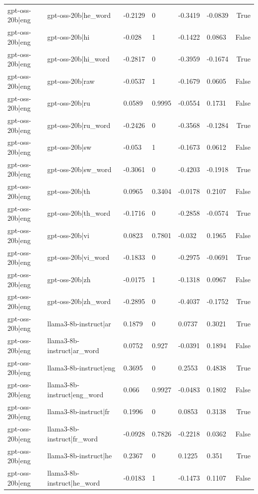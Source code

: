 \begin{table}
\begin{tabular}{llllllr}
gpt-oss-20b|eng & gpt-oss-20b|he_word & -0.2129 & 0 & -0.3419 & -0.0839 & True \\
gpt-oss-20b|eng & gpt-oss-20b|hi & -0.028 & 1 & -0.1422 & 0.0863 & False \\
gpt-oss-20b|eng & gpt-oss-20b|hi_word & -0.2817 & 0 & -0.3959 & -0.1674 & True \\
gpt-oss-20b|eng & gpt-oss-20b|raw & -0.0537 & 1 & -0.1679 & 0.0605 & False \\
gpt-oss-20b|eng & gpt-oss-20b|ru & 0.0589 & 0.9995 & -0.0554 & 0.1731 & False \\
gpt-oss-20b|eng & gpt-oss-20b|ru_word & -0.2426 & 0 & -0.3568 & -0.1284 & True \\
gpt-oss-20b|eng & gpt-oss-20b|sw & -0.053 & 1 & -0.1673 & 0.0612 & False \\
gpt-oss-20b|eng & gpt-oss-20b|sw_word & -0.3061 & 0 & -0.4203 & -0.1918 & True \\
gpt-oss-20b|eng & gpt-oss-20b|th & 0.0965 & 0.3404 & -0.0178 & 0.2107 & False \\
gpt-oss-20b|eng & gpt-oss-20b|th_word & -0.1716 & 0 & -0.2858 & -0.0574 & True \\
gpt-oss-20b|eng & gpt-oss-20b|vi & 0.0823 & 0.7801 & -0.032 & 0.1965 & False \\
gpt-oss-20b|eng & gpt-oss-20b|vi_word & -0.1833 & 0 & -0.2975 & -0.0691 & True \\
gpt-oss-20b|eng & gpt-oss-20b|zh & -0.0175 & 1 & -0.1318 & 0.0967 & False \\
gpt-oss-20b|eng & gpt-oss-20b|zh_word & -0.2895 & 0 & -0.4037 & -0.1752 & True \\
gpt-oss-20b|eng & llama3-8b-instruct|ar & 0.1879 & 0 & 0.0737 & 0.3021 & True \\
gpt-oss-20b|eng & llama3-8b-instruct|ar_word & 0.0752 & 0.927 & -0.0391 & 0.1894 & False \\
gpt-oss-20b|eng & llama3-8b-instruct|eng & 0.3695 & 0 & 0.2553 & 0.4838 & True \\
gpt-oss-20b|eng & llama3-8b-instruct|eng_word & 0.066 & 0.9927 & -0.0483 & 0.1802 & False \\
gpt-oss-20b|eng & llama3-8b-instruct|fr & 0.1996 & 0 & 0.0853 & 0.3138 & True \\
gpt-oss-20b|eng & llama3-8b-instruct|fr_word & -0.0928 & 0.7826 & -0.2218 & 0.0362 & False \\
gpt-oss-20b|eng & llama3-8b-instruct|he & 0.2367 & 0 & 0.1225 & 0.351 & True \\
gpt-oss-20b|eng & llama3-8b-instruct|he_word & -0.0183 & 1 & -0.1473 & 0.1107 & False \\

\end{tabular}
\end{table}
